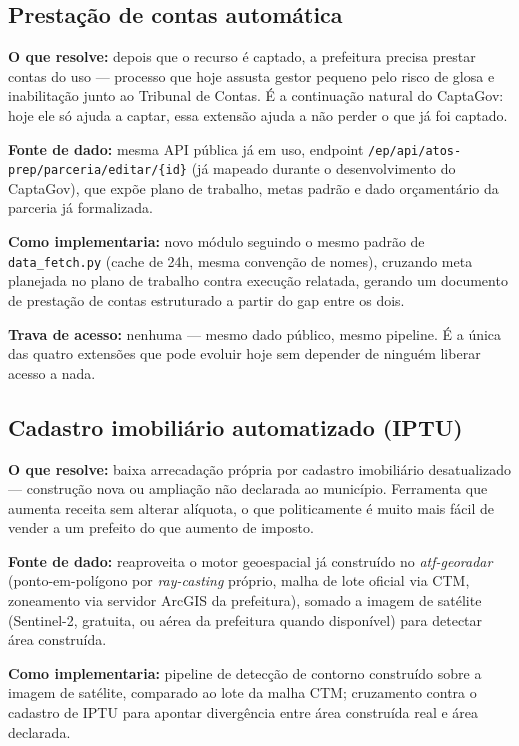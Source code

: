 \documentclass[11pt,a4paper]{article}
\newcommand{\codigo}[1]{\texttt{\small #1}}
\begin{document}
\subsection{Prestação de contas automática}

\textbf{O que resolve:} depois que o recurso é captado, a prefeitura precisa prestar contas
do uso --- processo que hoje assusta gestor pequeno pelo risco de glosa e inabilitação junto
ao Tribunal de Contas. É a continuação natural do CaptaGov: hoje ele só ajuda a captar, essa
extensão ajuda a não perder o que já foi captado.

\textbf{Fonte de dado:} mesma API pública já em uso, endpoint
\codigo{/ep/api/atos-prep/parceria/editar/\{id\}} (já mapeado durante o desenvolvimento do
CaptaGov), que expõe plano de trabalho, metas padrão e dado orçamentário da parceria já
formalizada.

\textbf{Como implementaria:} novo módulo seguindo o mesmo padrão de
\codigo{data\_fetch.py} (cache de 24h, mesma convenção de nomes), cruzando meta planejada no
plano de trabalho contra execução relatada, gerando um documento de prestação de contas
estruturado a partir do gap entre os dois.

\textbf{Trava de acesso:} nenhuma --- mesmo dado público, mesmo pipeline. É a única das
quatro extensões que pode evoluir hoje sem depender de ninguém liberar acesso a nada.

\subsection{Cadastro imobiliário automatizado (IPTU)}

\textbf{O que resolve:} baixa arrecadação própria por cadastro imobiliário desatualizado ---
construção nova ou ampliação não declarada ao município. Ferramenta que aumenta receita sem
alterar alíquota, o que politicamente é muito mais fácil de vender a um prefeito do que
aumento de imposto.

\textbf{Fonte de dado:} reaproveita o motor geoespacial já construído no \emph{atf-georadar}
(ponto-em-polígono por \emph{ray-casting} próprio, malha de lote oficial via CTM,
zoneamento via servidor ArcGIS da prefeitura), somado a imagem de satélite (Sentinel-2,
gratuita, ou aérea da prefeitura quando disponível) para detectar área construída.

\textbf{Como implementaria:} pipeline de detecção de contorno construído sobre a imagem de
satélite, comparado ao lote da malha CTM; cruzamento contra o cadastro de IPTU para apontar
divergência entre área construída real e área declarada.
\end{document}
